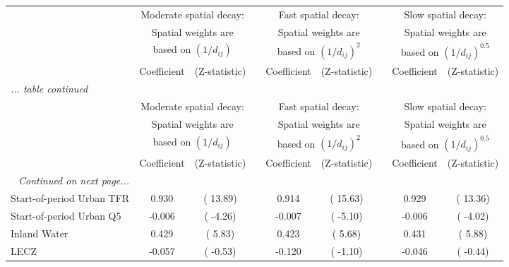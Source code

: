  \begin{center}
 \begin{sidewaystable}
 \caption{Panel data city growth regression models
  with spatially correlated errors, Distance-based
  spatial weights ($d_{ij}$ denotes the distance between
  cities $i$ and $j$), Spatial weights are standardized.
  Assume that spatial interaction among cities occurs
  only within country
  \label{} }
 \begin{longtable}{lcccccccc}\hline
 &\multicolumn{2}{c}{Moderate spatial decay:}&&
 \multicolumn{2}{c}{Fast spatial decay:}&&
 \multicolumn{2}{c}{Slow spatial decay:} \\
 &\multicolumn{2}{c}{Spatial weights are}&&
 \multicolumn{2}{c}{Spatial weights are}&&
 \multicolumn{2}{c}{Spatial weights are} \\
 &\multicolumn{2}{c}{based on $(1/d_{ij})$}&&
 \multicolumn{2}{c}{based on $(1/d_{ij})^2$}&&
 \multicolumn{2}{c}{based on $(1/d_{ij})^{0.5}$} \\
 \cmidrule{2-3}\cmidrule{5-6}\cmidrule{8-9}
 &Coefficient &(Z-statistic) &&
 Coefficient &(Z-statistic) &&
 Coefficient &(Z-statistic) \\\hline
 \endfirsthead
 \multicolumn{}{l}{\emph{... table \thetable{} continued}} \\\hline
 &\multicolumn{2}{c}{Moderate spatial decay:}&&
 \multicolumn{2}{c}{Fast spatial decay:}&&
 \multicolumn{2}{c}{Slow spatial decay:} \\
 &\multicolumn{2}{c}{Spatial weights are}&&
 \multicolumn{2}{c}{Spatial weights are}&&
 \multicolumn{2}{c}{Spatial weights are} \\
 &\multicolumn{2}{c}{based on $(1/d_{ij})$}&&
 \multicolumn{2}{c}{based on $(1/d_{ij})^2$}&&
 \multicolumn{2}{c}{based on $(1/d_{ij})^{0.5}$} \\
 \cmidrule{2-3}\cmidrule{5-6}\cmidrule{8-9}
 &Coefficient &(Z-statistic) &&
 Coefficient &(Z-statistic) &&
 Coefficient &(Z-statistic) \\\hline
 \endhead 
 \hline
 \multicolumn{}{r}{\emph{Continued on next page...}}\\
 \endfoot
 \endlastfoot
Start-of-period Urban TFR&  0.930&(  13.89)&&  0.914&(  15.63)&&  0.929&(  13.36)\\
Start-of-period Urban Q5 & -0.006&(  -4.26)&& -0.007&(  -5.10)&& -0.006&(  -4.02)\\
Inland Water             &  0.429&(   5.83)&&  0.423&(   5.68)&&  0.431&(   5.88)\\
LECZ                     & -0.057&(  -0.53)&& -0.120&(  -1.10)&& -0.046&(  -0.44)\\

\end{longtable}
\end{sidewaystable}
\end{center}
